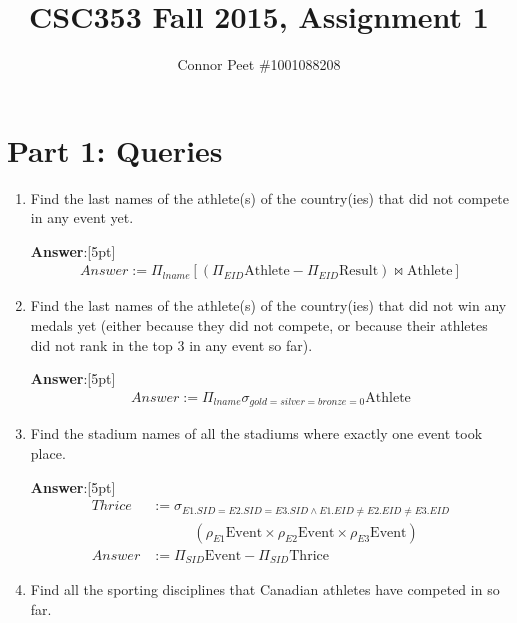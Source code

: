 \documentclass{article}
\title{CSC353 Fall 2015, Assignment 1}
\author{Connor Peet \#1001088208}
\begin{document}
\maketitle

\section*{Part 1: Queries}

\begin{enumerate}

\item   %
Find the last names of the athlete(s) of the country(ies) that did not compete in any event yet.

{\bf Answer}:[5pt]
\begin{equation*}
\begin{aligned}
Answer := \Pi_{lname} [(\Pi_{EID} \mathrm{Athlete} - \Pi_{EID} \mathrm{Result}) \bowtie \mathrm{Athlete}]
\end{aligned}
\end{equation*}

\item   %
Find the last names of the athlete(s) of the country(ies) that did not win any medals yet (either because they did not compete, or because their athletes did not rank in the top 3 in any event so far).

{\bf Answer}:[5pt]
\begin{equation*}
\begin{aligned}
Answer := \Pi_{lname} \sigma_{gold=silver=bronze=0} \mathrm{Athlete}
\end{aligned}
\end{equation*}


\item   %
Find the stadium names of all the stadiums where exactly one event took place.

{\bf Answer}:[5pt]
\begin{equation*}
\begin{aligned}
Thrice & := \sigma_{E1.SID=E2.SID=E3.SID \land E1.EID \neq E2.EID \neq E3.EID}\\
    & \quad \quad \quad (\rho_{E1} \mathrm{Event} \times \rho_{E2} \mathrm{Event} \times \rho_{E3} \mathrm{Event})\\
Answer & := \Pi_{SID} \mathrm{Event} - \Pi_{SID} \mathrm{Thrice}
\end{aligned}
\end{equation*}


\item   %
Find all the sporting disciplines that Canadian athletes have competed in so far.


\end{enumerate}
\end{document}
